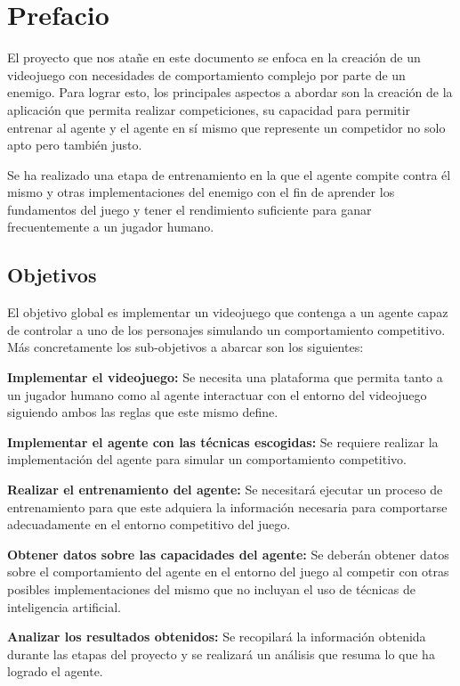 \chapter{Prefacio}

El proyecto que nos atañe en este documento se enfoca en la creación de un videojuego con necesidades de comportamiento complejo por parte de un enemigo. Para lograr esto, los principales aspectos a abordar son la creación de la aplicación que permita realizar competiciones, su capacidad para permitir entrenar al agente y el agente en sí mismo que represente un competidor no solo apto pero también justo.

\bigskip

Se ha realizado una etapa de entrenamiento en la que el agente compite contra él mismo y otras implementaciones del enemigo con el fin de aprender los fundamentos del juego y tener el rendimiento suficiente para ganar frecuentemente a un jugador humano.

\section{Objetivos}

El objetivo global es implementar un videojuego que contenga a un agente capaz de controlar a uno de los personajes simulando un comportamiento competitivo. Más concretamente los sub-objetivos a abarcar son los siguientes:

\begin{enumerate}
	
	{\item {\bf Implementar el videojuego:}
		Se necesita una plataforma que permita tanto a un jugador humano como al agente interactuar con el entorno del videojuego siguiendo ambos las reglas que este mismo define.
	}

	{\item {\bf Implementar el agente con las técnicas escogidas:}
		Se requiere realizar la implementación del agente para simular un comportamiento competitivo.
	}

	{\item {\bf Realizar el entrenamiento del agente:}
		Se necesitará ejecutar un proceso de entrenamiento para que este adquiera la información necesaria para comportarse adecuadamente en el entorno competitivo del juego.
	}

	{\item {\bf Obtener datos sobre las capacidades del agente:}
		Se deberán obtener datos sobre el comportamiento del agente en el entorno del juego al competir con otras posibles implementaciones del mismo que no incluyan el uso de técnicas de inteligencia artificial.
	}

	{\item {\bf Analizar los resultados obtenidos:}
		Se recopilará la información obtenida durante las etapas del proyecto y se realizará un análisis que resuma lo que ha logrado el agente.
	}
	
\end{enumerate}

